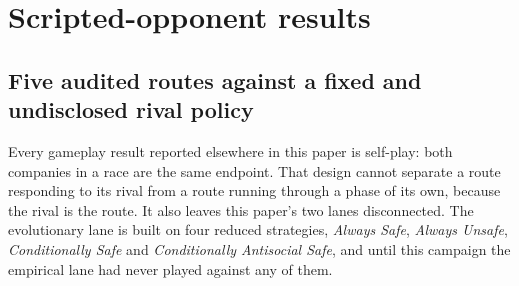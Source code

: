 \documentclass[sigconf,anonymous]{aamas}
\begin{document}

\section{Scripted-opponent results}

\subsection{Five audited routes against a fixed and undisclosed rival policy}
\label{app:scripted-opponent}

Every gameplay result reported elsewhere in this paper is self-play: both
companies in a race are the same endpoint. That design cannot separate a route
responding to its rival from a route running through a phase of its own, because
the rival is the route. It also leaves this paper's two lanes disconnected. The
evolutionary lane is built on four reduced strategies, \emph{Always Safe},
\emph{Always Unsafe}, \emph{Conditionally Safe} and \emph{Conditionally
Antisocial Safe}, and until this campaign the empirical lane had never played against any of them.
\end{document}
